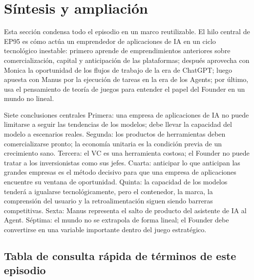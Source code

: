 \section{Síntesis y ampliación}

Esta sección condensa todo el episodio en un marco reutilizable. El hilo central de EP95 es cómo actúa un emprendedor de aplicaciones de IA en un ciclo tecnológico inestable: primero aprende de emprendimientos anteriores sobre comercialización, capital y anticipación de las plataformas; después aprovecha con Monica la oportunidad de los flujos de trabajo de la era de ChatGPT; luego apuesta con Manus por la ejecución de tareas en la era de los Agents; por último, usa el pensamiento de teoría de juegos para entender el papel del Founder en un mundo no lineal.

\begin{importantbox}{Siete conclusiones centrales}
Primera: una empresa de aplicaciones de IA no puede limitarse a seguir las tendencias de los modelos; debe llevar la capacidad del modelo a escenarios reales. Segunda: los productos de herramientas deben comercializarse pronto; la economía unitaria es la condición previa de un crecimiento sano. Tercera: el VC es una herramienta costosa; el Founder no puede tratar a los inversionistas como sus jefes. Cuarta: anticipar lo que anticipan las grandes empresas es el método decisivo para que una empresa de aplicaciones encuentre su ventana de oportunidad. Quinta: la capacidad de los modelos tenderá a igualarse tecnológicamente, pero el contenedor, la marca, la comprensión del usuario y la retroalimentación siguen siendo barreras competitivas. Sexta: Manus representa el salto de producto del asistente de IA al Agent. Séptima: el mundo no se extrapola de forma lineal; el Founder debe convertirse en una variable importante dentro del juego estratégico.
\end{importantbox}

\subsection{Tabla de consulta rápida de términos de este episodio}

